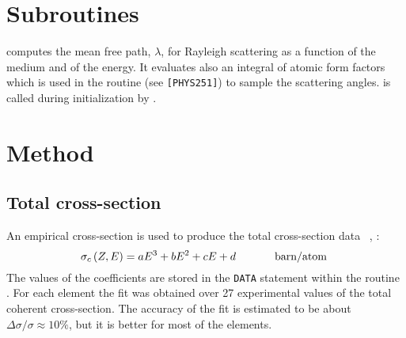 \section{Subroutines}
 
 computes the mean free path, $\lambda$, for Rayleigh
scattering as a function of the medium and of the energy. It evaluates 
also an integral of atomic form factors which is used in the routine 
 (see {\tt [PHYS251]}) to sample the scattering angles. 
 is called during initialization by .

\section{ Method }
 
\subsection{Total cross-section}
An empirical cross-section is used to produce the total cross-section
data~%
               {\cite{bib-EGS3}, \cite{bib-HUB1}}:
\begin{equation}
\sigma_c \left( Z,E \right) = aE^3 + b E^2 + c E + d 
\mbox{ \hspace{1cm} barn/atom }
\end{equation}
The values of the coefficients are stored in the 
{\tt DATA} statement within the routine
. For each element the fit was obtained over 27 experimental
values of the total coherent cross-section. The accuracy of the
fit is estimated to be about $\Delta \sigma/\sigma \approx 10\%$, but
it is better for most of the elements.
 
